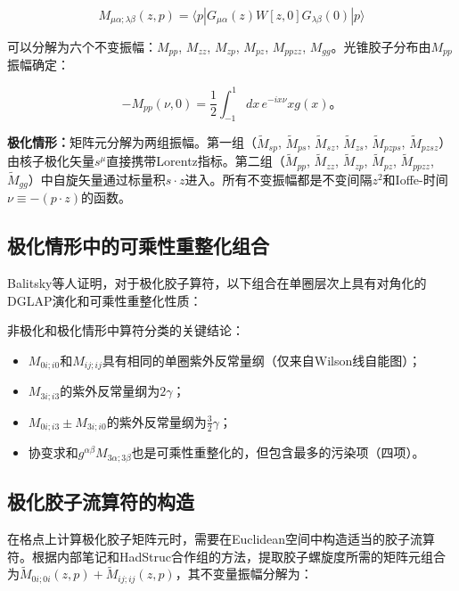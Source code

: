 \documentclass[12pt,a4paper]{ctexart}
\theoremstyle{definition}
\begin{document}
\begin{equation}
M_{\mu\alpha;\lambda\beta}(z, p) = \langle p| G_{\mu\alpha}(z) W[z, 0] G_{\lambda\beta}(0) |p\rangle
\label{eq:unpol_ME}
\end{equation}

可以分解为六个不变振幅：$M_{pp}$, $M_{zz}$, $M_{zp}$, $M_{pz}$, $M_{ppzz}$, $M_{gg}$。光锥胶子分布由$M_{pp}$振幅确定：

\begin{equation}
-M_{pp}(\nu, 0) = \frac{1}{2} \int_{-1}^{1} dx\, e^{-ix\nu} x g(x)。
\label{eq:Mpp_to_pdf}
\end{equation}

\textbf{极化情形：}矩阵元分解为两组振幅\cite{Egerer2022}。第一组（$\tilde{M}_{sp}$, $\tilde{M}_{ps}$, $\tilde{M}_{sz}$, $\tilde{M}_{zs}$, $\tilde{M}_{pzps}$, $\tilde{M}_{pzsz}$）由核子极化矢量$s^\mu$直接携带Lorentz指标。第二组（$\tilde{M}_{pp}$, $\tilde{M}_{zz}$, $\tilde{M}_{zp}$, $\tilde{M}_{pz}$, $\tilde{M}_{ppzz}$, $\tilde{M}_{gg}$）中自旋矢量通过标量积$s \cdot z$进入。所有不变振幅都是不变间隔$z^2$和Ioffe-时间$\nu \equiv -(p \cdot z)$的函数。

\subsection{极化情形中的可乘性重整化组合}

Balitsky等人\cite{Balitsky2020}证明，对于极化胶子算符，以下组合在单圈层次上具有对角化的DGLAP演化和可乘性重整化性质：

非极化和极化情形中算符分类的关键结论\cite{Balitsky2020}：

\begin{itemize}
    \item $M_{0i;i0}$和$M_{ij;ij}$具有相同的单圈紫外反常量纲（仅来自Wilson线自能图）；
    \item $M_{3i;i3}$的紫外反常量纲为$2\gamma$；
    \item $M_{0i;i3} \pm M_{3i;i0}$的紫外反常量纲为$\frac{3}{2}\gamma$；
    \item 协变求和$g^{\alpha\beta}M_{3\alpha;3\beta}$也是可乘性重整化的，但包含最多的污染项（四项）。
\end{itemize}

\subsection{极化胶子流算符的构造}

在格点上计算极化胶子矩阵元时，需要在Euclidean空间中构造适当的胶子流算符。根据内部笔记\cite{NoteGluonPDFs}和HadStruc合作组的方法\cite{Egerer2022}，提取胶子螺旋度所需的矩阵元组合为$\tilde{M}_{0i;0i}(z,p) + \tilde{M}_{ij;ij}(z,p)$，其不变量振幅分解为：
\end{document}
